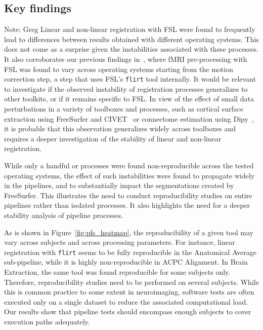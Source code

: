 \documentclass[a4paper,num-refs]{oup-contemporary}
\newcommand{\note}[2]{\color{blue}Note: #1\color{black}}
\newcommand{\flirt}[0]{\texttt{flirt}\xspace}
\begin{document}
\subsection{Key findings}
\note{Greg}{feel free to ignore, but a peeve of mine is one heading directly following another. Is there some
kind of high-level summary you could put above this, or just omit the key-findings label?}
Linear and non-linear registration with FSL were found to
frequently lead to differences between results obtained with different
operating systems. This does not come as a surprise given the instabilities
associated with these processes. It also corroborates our previous findings
in~\cite{Glatard2015}, where fMRI pre-processing with FSL was found to vary across operating systems 
starting from the motion
correction step, a step that uses FSL's \flirt tool internally. It
would be relevant to investigate if the observed instability of
registration processes generalizes to other toolkits, or if it remains specific
to FSL. In view of the effect of small data perturbations in a variety of
toolboxes and processes, such as cortical surface extraction using
FreeSurfer and CIVET~\cite{Lewis2017-ll} or connectome estimation using
Dipy~\cite{kiar2019comparing}, it is probable that this observation
generalizes widely across toolboxes and requires a deeper investigation of
the stability of linear and non-linear registration.

While only a handful or processes were found non-reproducible across the
tested operating systems, the effect of such instabilities were found to
propagate widely in the pipelines, and to substantially impact the segmentations
created by FreeSurfer. This illustrates the need to conduct reproducibility studies
on entire pipelines rather than isolated processes. It also highlights the need 
for a deeper stability analysis of pipeline processes.

As is shown in Figure~\ref{fig:pfs_heatmap}, the reproducibility of
a given tool may vary across subjects and across processing parameters. For
instance, linear registration with \flirt seems to be fully reproducible in
the Anatomical Average sub-pipeline, while it is highly non-reproducible in
ACPC Alignment. In Brain Extraction, the same tool was found reproducible
for some subjects only. Therefore, reproducibility studies need to be
performed on several subjects. While this is common practice to some extent in neuroimaging, 
software tests are often executed only on a single dataset to reduce the
associated computational load. Our results show that pipeline tests should 
encompass enough subjects to cover execution paths adequately.
\end{document}
